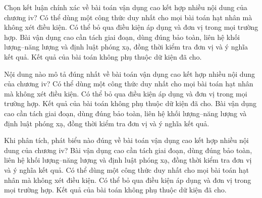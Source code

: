 \begin{ex}
Chọn kết luận chính xác về bài toán vận dụng cao kết hợp nhiều nội dung của chương iv?
\choice
{Có thể dùng một công thức duy nhất cho mọi bài toán hạt nhân mà không xét điều kiện.}
{Có thể bỏ qua điều kiện áp dụng và đơn vị trong mọi trường hợp.}
{\True Bài vận dụng cao cần tách giai đoạn, dùng đúng bảo toàn, liên hệ khối lượng–năng lượng và định luật phóng xạ, đồng thời kiểm tra đơn vị và ý nghĩa kết quả.}
{Kết quả của bài toán không phụ thuộc dữ kiện đã cho.}
\end{ex}

\begin{ex}
Nội dung nào mô tả đúng nhất về bài toán vận dụng cao kết hợp nhiều nội dung của chương iv?
\choice
{Có thể dùng một công thức duy nhất cho mọi bài toán hạt nhân mà không xét điều kiện.}
{Có thể bỏ qua điều kiện áp dụng và đơn vị trong mọi trường hợp.}
{Kết quả của bài toán không phụ thuộc dữ kiện đã cho.}
{\True Bài vận dụng cao cần tách giai đoạn, dùng đúng bảo toàn, liên hệ khối lượng–năng lượng và định luật phóng xạ, đồng thời kiểm tra đơn vị và ý nghĩa kết quả.}
\end{ex}

\begin{ex}
Khi phân tích, phát biểu nào đúng về bài toán vận dụng cao kết hợp nhiều nội dung của chương iv?
\choice
{\True Bài vận dụng cao cần tách giai đoạn, dùng đúng bảo toàn, liên hệ khối lượng–năng lượng và định luật phóng xạ, đồng thời kiểm tra đơn vị và ý nghĩa kết quả.}
{Có thể dùng một công thức duy nhất cho mọi bài toán hạt nhân mà không xét điều kiện.}
{Có thể bỏ qua điều kiện áp dụng và đơn vị trong mọi trường hợp.}
{Kết quả của bài toán không phụ thuộc dữ kiện đã cho.}
\end{ex}


